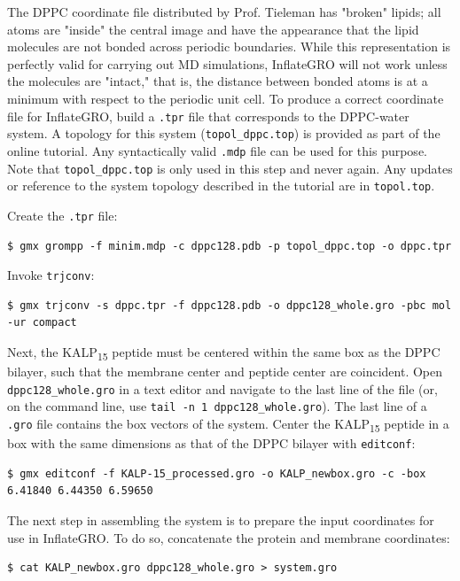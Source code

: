 \documentclass[9pt,tutorial,pubversion]{livecoms}
\begin{document}
The DPPC coordinate file distributed by Prof. Tieleman has "broken" lipids; all atoms are "inside" the central image and have the appearance that the lipid molecules are not bonded across periodic boundaries. While this representation is perfectly valid for carrying out MD simulations, InflateGRO will not work unless the molecules are "intact," that is, the distance between bonded atoms is at a minimum with respect to the periodic unit cell. To produce a correct coordinate file for InflateGRO, build a \texttt{.tpr} file that corresponds to the DPPC-water system. A topology for this system (\texttt{topol\_dppc.top}) is provided as part of the online tutorial. Any syntactically valid \texttt{.mdp} file can be used for this purpose. Note that \texttt{topol\_dppc.top} is only used in this step and never again. Any updates or reference to the system topology described in the tutorial are in \texttt{topol.top}.

Create the \texttt{.tpr} file:

\begin{lstlisting}
$ gmx grompp -f minim.mdp -c dppc128.pdb -p topol_dppc.top -o dppc.tpr
\end{lstlisting}

Invoke \texttt{trjconv}:

\begin{lstlisting}
$ gmx trjconv -s dppc.tpr -f dppc128.pdb -o dppc128_whole.gro -pbc mol -ur compact
\end{lstlisting}

Next, the KALP\textsubscript{15} peptide must be centered within the same box as the DPPC bilayer, such that the membrane center and peptide center are coincident. Open \texttt{dppc128\_whole.gro} in a text editor and navigate to the last line of the file (or, on the command line, use \texttt{tail -n 1 dppc128\_whole.gro}). The last line of a \texttt{.gro} file contains the box vectors of the system. Center the KALP\textsubscript{15} peptide in a box with the same dimensions as that of the DPPC bilayer with \texttt{editconf}:

\begin{lstlisting}
$ gmx editconf -f KALP-15_processed.gro -o KALP_newbox.gro -c -box 6.41840 6.44350 6.59650
\end{lstlisting}

The next step in assembling the system is to prepare the input coordinates for use in InflateGRO. To do so, concatenate the protein and membrane coordinates:

\begin{lstlisting}
$ cat KALP_newbox.gro dppc128_whole.gro > system.gro
\end{lstlisting}
\end{document}
